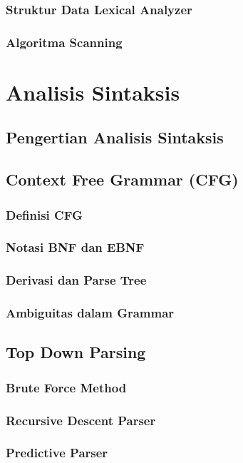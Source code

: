 \documentclass{book}
\begin{document}
         \subsection{Struktur Data Lexical Analyzer}
         \subsection{Algoritma Scanning}

    
\chapter{Analisis Sintaksis}
    \section{Pengertian Analisis Sintaksis}
    \section{Context Free Grammar (CFG)}
         \subsection{Definisi CFG}
         \subsection{Notasi BNF dan EBNF}
         \subsection{Derivasi dan Parse Tree}
         \subsection{Ambiguitas dalam Grammar}
    \section{Top Down Parsing}
         \subsection{Brute Force Method}
         \subsection{Recursive Descent Parser}
         \subsection{Predictive Parser}
\end{document}
